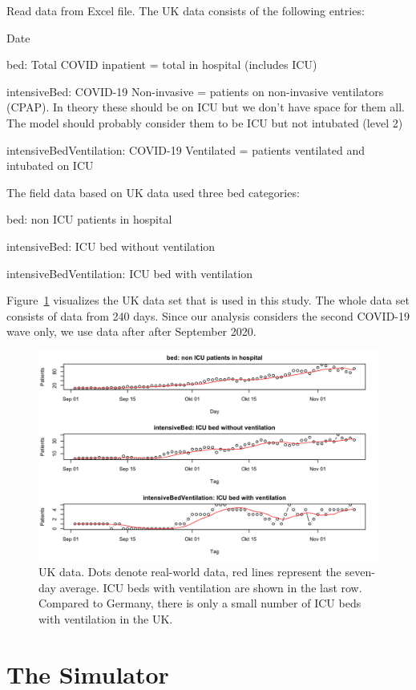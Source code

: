 \documentclass[conference]{IEEEtran}
\begin{document}
Read data from Excel file.
The UK data consists of the following entries:
\begin{compactitem}
\item Date
\item bed: Total COVID inpatient = total in hospital (includes ICU)
\item intensiveBed: COVID-19 Non-invasive = patients on non-invasive ventilators (CPAP). In theory these should be on ICU but we don’t have space for them all. The model should probably consider them to be ICU but not intubated (level 2)
\item intensiveBedVentilation: COVID-19 Ventilated = patients ventilated and intubated on ICU
\end{compactitem}
The field data based on UK data used three bed categories: 
\begin{compactenum}
\item bed: non ICU patients in hospital
\item intensiveBed: ICU bed without ventilation
\item intensiveBedVentilation: \gls{ICU} bed with ventilation
\end{compactenum}
Figure~\ref{fig:ukdata} visualizes the UK data set that is used in this study. The whole data set consists of data from 240 days. Since our analysis considers the second \gls{COVID-19} wave only, we use data after after September 2020.
\begin{figure}
    \centering
    \includegraphics[width=0.75\linewidth]{ukdata3.png}
    \caption{UK data. Dots denote real-world data, red lines represent the seven-day average. \gls{ICU} beds with ventilation are shown in the last row. Compared to Germany, there is only a small number of \gls{ICU} beds with ventilation in the UK.}
\label{fig:ukdata}
\end{figure}



\section{The Simulator}\label{sec:sim}
\end{document}
